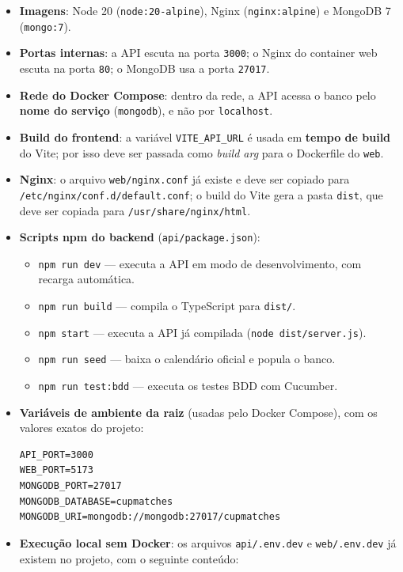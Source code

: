 \begingroup\sloppy
\begin{itemize}
  \item \textbf{Imagens}: Node 20 (\texttt{node:20-alpine}), Nginx
        (\texttt{nginx:alpine}) e MongoDB 7 (\texttt{mongo:7}).
  \item \textbf{Portas internas}: a API escuta na porta \texttt{3000}; o Nginx do
        container web escuta na porta \texttt{80}; o MongoDB usa a porta
        \texttt{27017}.
  \item \textbf{Rede do Docker Compose}: dentro da rede, a API acessa o banco pelo
        \textbf{nome do serviço} (\texttt{mongodb}), e não por \texttt{localhost}.
  \item \textbf{Build do frontend}: a variável \texttt{VITE\_API\_URL} é usada em
        \textbf{tempo de build} do Vite; por isso deve ser passada como
        \emph{build arg} para o Dockerfile do \texttt{web}.
  \item \textbf{Nginx}: o arquivo \texttt{web/nginx.conf} já existe e deve ser
        copiado para \texttt{/etc/nginx/conf.d/\allowbreak default.conf}; o build
        do Vite gera a pasta \texttt{dist}, que deve ser copiada para
        \texttt{/usr/share/\allowbreak nginx/\allowbreak html}.
  \item \textbf{Scripts npm do backend} (\texttt{api/package.json}):
\begin{itemize}
  \item \texttt{npm run dev} --- executa a API em modo de desenvolvimento, com
        recarga automática.
  \item \texttt{npm run build} --- compila o TypeScript para \texttt{dist/}.
  \item \texttt{npm start} --- executa a API já compilada (\texttt{node
        dist/server.js}).
  \item \texttt{npm run seed} --- baixa o calendário oficial e popula o banco.
  \item \texttt{npm run test:bdd} --- executa os testes BDD com Cucumber.
\end{itemize}
  \item \textbf{Variáveis de ambiente da raiz} (usadas pelo Docker Compose), com os
        valores exatos do projeto:

\begin{lstlisting}
API_PORT=3000
WEB_PORT=5173
MONGODB_PORT=27017
MONGODB_DATABASE=cupmatches
MONGODB_URI=mongodb://mongodb:27017/cupmatches
\end{lstlisting}

  \item \textbf{Execução local sem Docker}: os arquivos \texttt{api/.env.dev} e
        \texttt{web/.env.dev} já existem no projeto, com o seguinte conteúdo:


\end{itemize}
